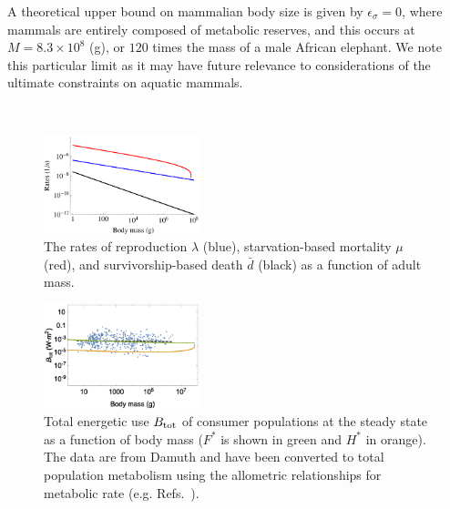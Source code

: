 \documentclass[onecolumn,preprintnumbers,amsmath,amssymb,superscriptaddress]{revtex4}
\begin{document}
A theoretical upper bound on mammalian body size is given by $\epsilon_\sigma=0$, where mammals are entirely composed of metabolic reserves, and this occurs at $M=8.3\times 10^8$ (g), or $120$ times the mass of a male African elephant. We note this particular limit as it may have future relevance to considerations of the ultimate constraints on aquatic mammals.\\

\clearpage

\\


\begin{figure}[h!]
\centering
\includegraphics[width=0.4\textwidth]{mortality-rate-comparison.eps}
\caption{\small{The rates of reproduction $\lambda$ (blue), starvation-based mortality $\mu$ (red), and survivorship-based death $\bar{d}$ (black) as a function of adult mass.}\label{fig:ratescomp}}
\end{figure}

\begin{figure}[h!]
\centering
\includegraphics[width=0.4\textwidth]{fig_FPenergyequiv.eps}
\caption{\small{ Total energetic use $B_{\rm tot}$ of consumer populations at the steady state as a function of body mass ($F^*$ is shown in green and $H^*$ in orange).  The data are from Damuth \citep{Damuth:1987kr} and have been converted to
  total population metabolism using the allometric relationships for
  metabolic rate (e.g. Refs.~\citep{West:2001bv,hou,moses2008rmo}).}\label{fig:equivalence}}
\end{figure}

\clearpage

\\
\def\bibfont{\footnotesize}
\end{document}
